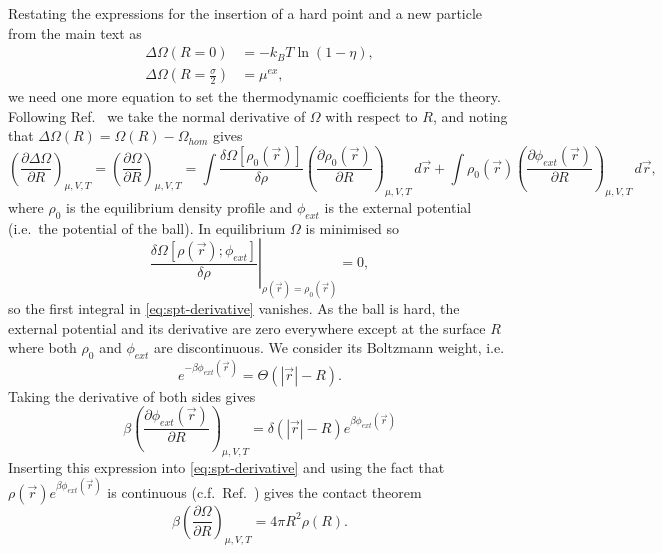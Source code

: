\documentclass[11pt]{report}
\begin{document}
Restating the expressions for the insertion of a hard point and a new particle from the main text as
\begin{align}
  \label{eq:spt-point} \Delta\Omega(R=0) &= -k_B T \ln{(1- \eta)}, \\
  \label{eq:spt-mu} \Delta\Omega\left(R=\frac{\sigma}{2}\right) &= \mu^{ex},
\end{align}
we need one more equation to set the thermodynamic coefficients for the theory.
Following Ref.\ \cite{Bryk2003} we take the normal derivative of $\Omega$ with respect to $R$, and noting that $\Delta\Omega(R) = \Omega(R) - \Omega_{hom}$ gives
\begin{equation}\label{eq:spt-derivative}
  \left( \frac{\partial \Delta \Omega}{\partial R} \right)_{\mu,V,T} =
  \left( \frac{\partial \Omega}{\partial R} \right)_{\mu,V,T} =
  \int
  \frac{\delta \Omega[\rho_0(\vec{r})]}{\delta \rho}
  \left( \frac{\partial \rho_0(\vec{r})}{\partial R} \right)_{\mu,V,T}
  \, d\vec{r} +
  \int
  \rho_0(\vec{r})
  \left( \frac{\partial \phi_{ext}(\vec{r})}{\partial R} \right)_{\mu,V,T}
  \, d\vec{r},
\end{equation}
where $\rho_0$ is the equilibrium density profile and $\phi_{ext}$ is the external potential (i.e.\ the potential of the ball).
In equilibrium $\Omega$ is minimised so
\begin{equation}
  \left.
  \frac{\delta \Omega[\rho(\vec{r}); \phi_{ext}]}{\delta \rho}
  \right|_{\rho(\vec{r})=\rho_0(\vec{r})} = 0,
\end{equation}
so the first integral in \eqref{eq:spt-derivative} vanishes.
As the ball is hard, the external potential and its derivative are zero everywhere except at the surface $R$ where both $\rho_0$ and $\phi_{ext}$ are discontinuous.
We consider its Boltzmann weight, i.e.\
\begin{equation}
  e^{-\beta\phi_{ext}(\vec{r})} = \Theta(|\vec{r}| - R).
\end{equation}
Taking the derivative of both sides gives
\begin{equation}
  \beta\left( \frac{\partial\phi_{ext}(\vec{r})}{\partial R} \right)_{\mu,V,T} =
  \delta(|\vec{r}| - R) e^{\beta\phi_{ext}(\vec{r})}
\end{equation}
Inserting this expression into \eqref{eq:spt-derivative} and using the fact that $\rho(\vec{r}) e^{\beta\phi_{ext}(\vec{r})}$ is continuous (c.f.\ Ref.\ \cite{Hansen2013}) gives the contact theorem
\begin{equation}
  \beta \left( \frac{\partial \Omega}{\partial R} \right)_{\mu,V,T} =
  4\pi R^2 \rho(R).
\end{equation}
\end{document}
